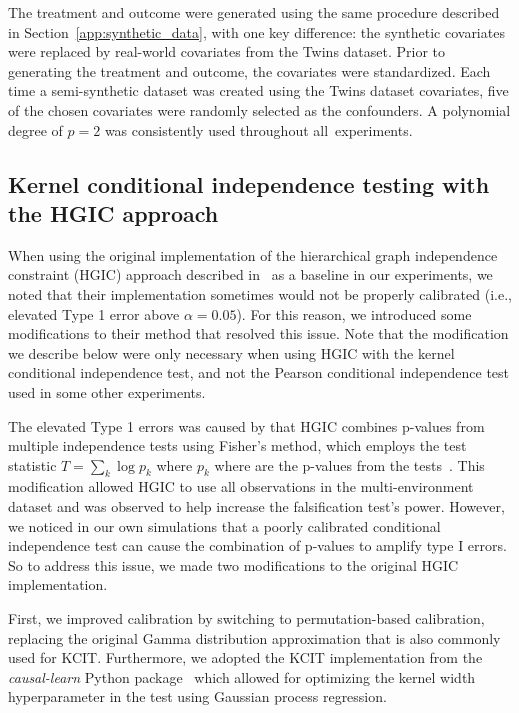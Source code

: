 \documentclass{article}
\begin{document}
The treatment and outcome were generated using the same procedure described in Section~\ref{app:synthetic_data}, with one key difference: the synthetic covariates were replaced by real-world covariates from the Twins dataset. Prior to generating the treatment and outcome, the covariates were standardized. Each time a semi-synthetic dataset was created using the Twins dataset covariates, five of the chosen covariates were randomly selected as the confounders. A polynomial degree of $p=2$ was consistently used throughout all~experiments.

\subsection{Kernel conditional independence testing with the HGIC approach} \label{app:hgic_implementation}
When using the original implementation of the hierarchical graph independence constraint (HGIC) approach described in~\citet{karlsson2023detecting} as a baseline in our experiments, we noted that their implementation sometimes would not be properly calibrated (i.e., elevated Type 1 error above $\alpha=0.05$). For this reason, we introduced some modifications to their method that resolved this issue. Note that the modification we describe below were only necessary when using HGIC with the kernel conditional independence test, and not the Pearson conditional independence test used in some other experiments.

The elevated Type 1 errors was caused by that HGIC combines p-values from multiple independence tests using Fisher's method, which employs the test statistic $T=\sum_k \log p_k$ where $p_k$ where are the p-values from the tests~\citep{fisher1925statistical}. This modification allowed HGIC to use all observations in the multi-environment dataset and was observed to help increase the falsification test's power. However, we noticed in our own simulations that a poorly calibrated conditional independence test can cause the combination of p-values to amplify type I errors. So to address this issue, we made two modifications to the original HGIC implementation.

First, we improved calibration by switching to permutation-based calibration, replacing the original Gamma distribution approximation that is also commonly used for KCIT. Furthermore, we adopted the KCIT implementation from the \textit{causal-learn} Python package~\citep{zheng2024causal} which allowed for optimizing the kernel width hyperparameter in the test using Gaussian process regression.
\end{document}
